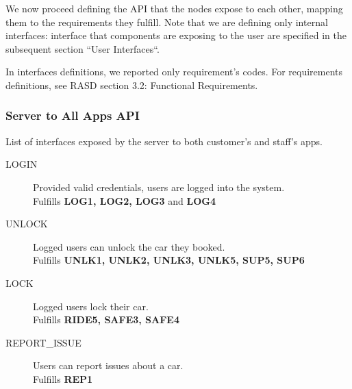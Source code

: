 \documentclass[11pt]{article} %
\begin{document}
\begin{description}
We now proceed defining the API that the nodes expose to each other, mapping them to the requirements they fulfill. Note that we are defining only internal interfaces: interface that components are exposing to the user are specified in the subsequent section ``User Interfaces``.

In interfaces definitions, we reported only requirement's codes. For requirements definitions, see RASD section 3.2: Functional Requirements.

\subsubsection{Server to All Apps API }
List of interfaces exposed by the server to both customer's and staff's apps.
\begin{description}
	\item[LOGIN] Provided valid credentials, users are logged into the system. \\ Fulfills \textbf{LOG1, LOG2, LOG3} and \textbf{LOG4}
	\item[UNLOCK] Logged users can unlock the car they booked. \\ Fulfills \textbf{UNLK1, UNLK2, UNLK3, UNLK5, SUP5, SUP6}	
	\item[LOCK] Logged users lock their car. \\ Fulfills \textbf{RIDE5, SAFE3, SAFE4}
	\item[REPORT\_ISSUE] Users can report issues about a car. \\ Fulfills \textbf{REP1}
\end{description}



\end{description}
\end{document}
